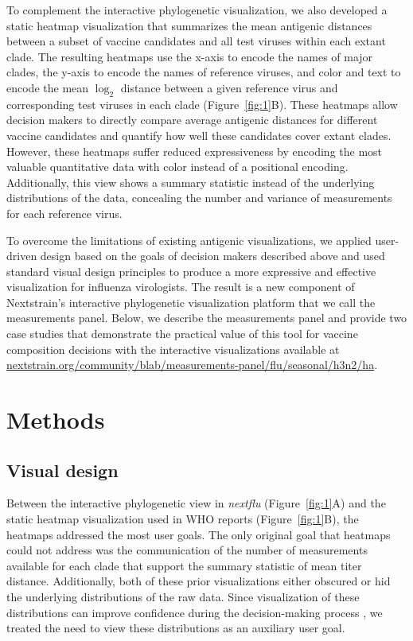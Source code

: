 \documentclass[utf8]{FrontiersinHarvard} %
\begin{document}
To complement the interactive phylogenetic visualization, we also developed a static heatmap visualization that summarizes the mean antigenic distances between a subset of vaccine candidates and all test viruses within each extant clade.
The resulting heatmaps use the x-axis to encode the names of major clades, the y-axis to encode the names of reference viruses, and color and text to encode the mean $\log_{2}$ distance between a given reference virus and corresponding test viruses in each clade (Figure~\ref{fig:1}B).
These heatmaps allow decision makers to directly compare average antigenic distances for different vaccine candidates and quantify how well these candidates cover extant clades.
However, these heatmaps suffer reduced expressiveness by encoding the most valuable quantitative data with color instead of a positional encoding.
Additionally, this view shows a summary statistic instead of the underlying distributions of the data, concealing the number and variance of measurements for each reference virus.

To overcome the limitations of existing antigenic visualizations, we applied user-driven design based on the goals of decision makers described above and used standard visual design principles to produce a more expressive and effective visualization for influenza virologists.
The result is a new component of Nextstrain's interactive phylogenetic visualization platform that we call the measurements panel.
Below, we describe the measurements panel and provide two case studies that demonstrate the practical value of this tool for vaccine composition decisions with the interactive visualizations available at \href{https://nextstrain.org/community/blab/measurements-panel/flu/seasonal/h3n2/ha}{nextstrain.org/community/blab/measurements-panel/flu/seasonal/h3n2/ha}.

\section{Methods}

\subsection{Visual design}

Between the interactive phylogenetic view in \emph{nextflu} (Figure~\ref{fig:1}A) and the static heatmap visualization used in WHO reports (Figure~\ref{fig:1}B), the heatmaps addressed the most user goals.
The only original goal that heatmaps could not address was the communication of the number of measurements available for each clade that support the summary statistic of mean titer distance.
Additionally, both of these prior visualizations either obscured or hid the underlying distributions of the raw data.
Since visualization of these distributions can improve confidence during the decision-making process \citep{correll2014error,Hullman2015,Fernandes2018}, we treated the need to view these distributions as an auxiliary user goal.
\end{document}
